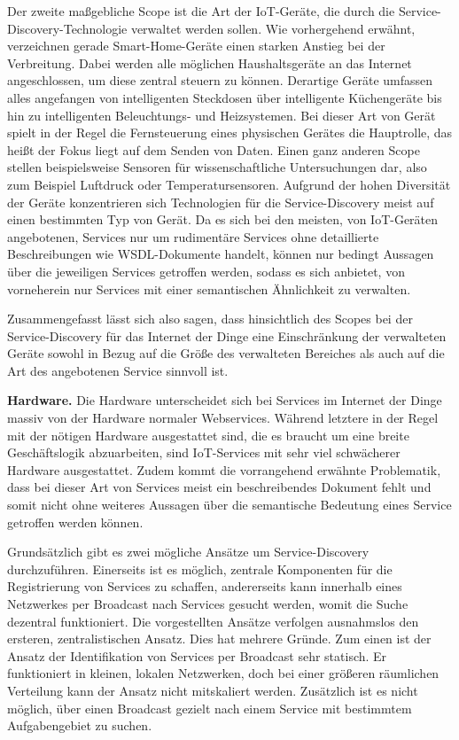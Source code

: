 \documentclass[conference,compsoc]{IEEEtran}
\begin{document}
Der zweite maßgebliche Scope ist die Art der IoT-Geräte, die durch die Service-Discovery-Technologie verwaltet werden sollen. Wie vorhergehend erwähnt, verzeichnen gerade Smart-Home-Geräte einen starken Anstieg bei der Verbreitung. Dabei werden alle möglichen Haushaltsgeräte an das Internet angeschlossen, um diese zentral steuern zu können. Derartige Geräte umfassen alles angefangen von intelligenten Steckdosen über intelligente Küchengeräte bis hin zu intelligenten Beleuchtungs- und Heizsystemen. Bei dieser Art von Gerät spielt in der Regel die Fernsteuerung eines physischen Gerätes die Hauptrolle, das heißt der Fokus liegt auf dem Senden von Daten. Einen ganz anderen Scope stellen beispielsweise Sensoren für wissenschaftliche Untersuchungen dar, also zum Beispiel Luftdruck oder Temperatursensoren. Aufgrund der hohen Diversität der Geräte konzentrieren sich Technologien für die Service-Discovery meist auf einen bestimmten Typ von Gerät. Da es sich bei den meisten, von IoT-Geräten angebotenen, Services nur um rudimentäre Services ohne detaillierte Beschreibungen wie WSDL-Dokumente handelt, können nur bedingt Aussagen über die jeweiligen Services getroffen werden, sodass es sich anbietet, von vorneherein nur Services mit einer semantischen Ähnlichkeit zu verwalten.

Zusammengefasst lässt sich also sagen, dass hinsichtlich des Scopes bei der Service-Discovery für das Internet der Dinge eine Einschränkung der verwalteten Geräte sowohl in Bezug auf die Größe des verwalteten Bereiches als auch auf die Art des angebotenen Service sinnvoll ist.

\textbf{Hardware.} Die Hardware unterscheidet sich bei Services im Internet der Dinge massiv von der Hardware normaler Webservices. Während letztere in der Regel mit der nötigen Hardware ausgestattet sind, die es braucht um eine breite Geschäftslogik abzuarbeiten, sind IoT-Services mit sehr viel schwächerer Hardware ausgestattet. Zudem kommt die vorrangehend erwähnte Problematik, dass bei dieser Art von Services meist ein beschreibendes Dokument fehlt und somit nicht ohne weiteres Aussagen über die semantische Bedeutung eines Service getroffen werden können.

Grundsätzlich gibt es zwei mögliche Ansätze um Service-Discovery durchzuführen. Einerseits ist es möglich, zentrale Komponenten für die Registrierung von Services zu schaffen, andererseits kann innerhalb eines Netzwerkes per Broadcast nach Services gesucht werden, womit die Suche dezentral funktioniert. Die vorgestellten Ansätze verfolgen ausnahmslos den ersteren, zentralistischen Ansatz. Dies hat mehrere Gründe. Zum einen ist der Ansatz der Identifikation von Services per Broadcast sehr statisch. Er funktioniert in kleinen, lokalen Netzwerken, doch bei einer größeren räumlichen Verteilung kann der Ansatz nicht mitskaliert werden. Zusätzlich ist es nicht möglich, über einen Broadcast gezielt nach einem Service mit bestimmtem Aufgabengebiet zu suchen.
\end{document}
